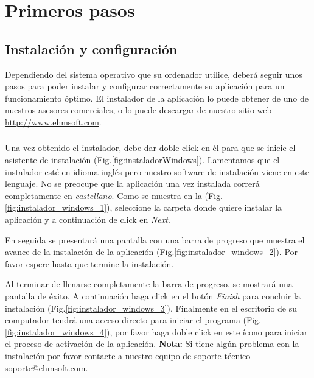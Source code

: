 \chapter{Primeros pasos}
\setcounter{page}{4}

\section{Instalaci\'on y configuraci\'on}
Dependiendo del sistema operativo que su ordenador utilice, deber\'a seguir unos pasos para poder instalar y
configurar correctamente su aplicaci\'on para un funcionamiento \'optimo. El instalador de la aplicaci\'on lo puede obtener de uno de nuestros asesores comerciales, o lo puede descargar de nuestro sitio web \url{http://www.ehmsoft.com}.

\subsection{\windows}
Una vez obtenido el instalador, debe dar doble click en \'el para que se inicie el asistente de instalaci\'on (Fig.\ref{fig:instaladorWindows}). Lamentamos que el instalador est\'e en idioma ingl\'es pero nuestro software de instalaci\'on viene en este lenguaje. No se preocupe que la aplicaci\'on una vez instalada correr\'a completamente en \emph{castellano}. Como se muestra en la (Fig.\ref{fig:instalador_windows_1}), seleccione la carpeta donde quiere instalar la aplicaci\'on y a continuaci\'on de click en \emph{Next}.

En seguida se presentar\'a una pantalla con una barra de progreso que muestra el avance de la instalaci\'on de la aplicaci\'on (Fig.\ref{fig:instalador_windows_2}). Por favor espere hasta que termine la instalaci\'on.

Al terminar de llenarse completamente la barra de progreso, se mostrar\'a una pantalla de \'exito. A continuaci\'on haga click en el bot\'on \emph{Finish} para concluir la instalaci\'on (Fig.\ref{fig:instalador_windows_3}).
Finalmente en el escritorio de su computador tendr\'a una acceso directo para iniciar el programa \softwareAbogadosDesktop (Fig.\ref{fig:instalador_windows_4}), por favor haga doble click en este \'icono para iniciar el proceso de activaci\'on de la aplicaci\'on.
\textbf{Nota:} Si tiene alg\'un problema con la instalaci\'on por favor contacte a nuestro equipo de soporte t\'ecnico \mbox{soporte@ehmsoft.com}.

